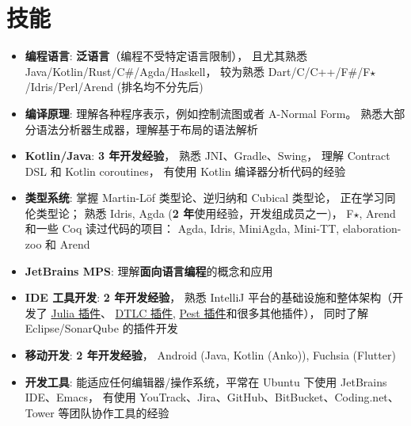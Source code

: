 \documentclass{resume}
\begin{document}
\section{技能}
\begin{itemize}[parsep=0.25ex]
  \item \textbf{编程语言}:
    \textbf{泛语言}（编程不受特定语言限制），
    且尤其熟悉 Java/Kotlin/Rust/C\#/Agda/Haskell，
    较为熟悉 Dart/C/C++/F\#/F$\star$/Idris/Perl/Arend (排名均不分先后)

  \item \textbf{编译原理}:
    理解各种程序表示，例如控制流图或者 A-Normal Form。
    熟悉大部分语法分析器生成器，理解基于布局的语法解析

  \item \textbf{Kotlin/Java}:
    \textbf{3 年开发经验}，
    熟悉 JNI、Gradle、Swing，
    理解 Contract DSL 和 Kotlin coroutines，
    有使用 Kotlin 编译器分析代码的经验

  \item \textbf{类型系统}:
    掌握 Martin-L\"{o}f 类型论、逆归纳和 Cubical 类型论，
    正在学习同伦类型论；
    熟悉 Idris, Agda (\textbf{2 年}使用经验，开发组成员之一)，
    F$\star$, Arend 和一些 Coq
    \subitem 读过代码的项目： Agda, Idris, MiniAgda, Mini-TT, elaboration-zoo 和 Arend

  \item \textbf{JetBrains MPS}:
    理解\textbf{面向语言编程}的概念和应用

  \item \textbf{IDE 工具开发}:
    \textbf{2 年开发经验}，
    熟悉 IntelliJ 平台的基础设施和整体架构（开发了
      \href{https://plugins.jetbrains.com/plugin/10413}
           {Julia 插件}、
      \href{https://plugins.jetbrains.com/plugin/12176}
           {DTLC 插件},
      \href{https://plugins.jetbrains.com/plugin/12046}
           {Pest 插件}和很多其他插件），
    同时了解 Eclipse/SonarQube 的插件开发

  \item \textbf{移动开发}:
    \textbf{2 年开发经验}，
    Android (Java, Kotlin (Anko)), Fuchsia (Flutter)

  \item \textbf{开发工具}:
    能适应任何编辑器/操作系统，平常在 Ubuntu 下使用 JetBrains IDE、Emacs，
    有使用 YouTrack、Jira、GitHub、BitBucket、Coding.net、Tower 等团队协作工具的经验
\end{itemize}
\end{document}
